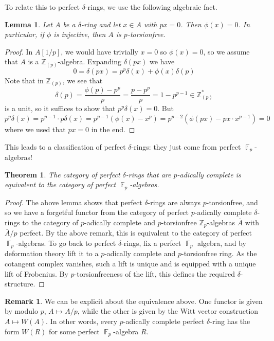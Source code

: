 \documentclass[12pt]{amsproc}
\newtheorem*{thm}{Theorem}
\newtheorem{lemma}{Lemma}
\theoremstyle{definition}
\newtheorem*{remark}{Remark}
\newcommand{\Z}{\mathbb{Z}}
\DeclareMathOperator{\F}{\mathbb{F}}
\begin{document}
To relate this to perfect $\delta$-rings, we use the following algebraic fact.

\begin{lemma} Let $A$ be a $\delta$-ring and let $x\in A$ with $px=0$. Then $\phi(x)=0$. In particular, if $\phi$ is injective, then $A$ is $p$-torsionfree. \end{lemma}
\begin{proof}
In $A[1/p]$, we would have trivially $x=0$ so $\phi(x)=0$, so we assume that $A$ is a $\Z_{(p)}$-algebra. Expanding $\delta(px)$ we have
\[	0 = \delta(px)=p^p\delta(x)+\phi(x)\delta(p)	\]
Note that in $\Z_{(p)}$, we see that
\[	\delta(p)=\frac{\phi(p)-p^p}{p}=\frac{p-p^p}{p}=1-p^{p-1}\in\Z^*_{(p)}	\]
is a unit, so it suffices to show that $p^p\delta(x)=0$. But
\[	p^p\delta(x)=p^{p-1}\cdot p\delta(x)=p^{p-1}(\phi(x)-x^p)=p^{p-2}(\phi(px)-px\cdot x^{p-1})=0	\]
where we used that $px=0$ in the end.
\end{proof}

This leads to a classification of perfect $\delta$-rings: they just come from perfect $\F_p$-algebras!

\begin{thm} The category of perfect $\delta$-rings that are $p$-adically complete is equivalent to the category of perfect $\F_p$-algebras.
\end{thm}
\begin{proof}
The above lemma shows that perfect $\delta$-rings are always $p$-torsionfree, and so we have a forgetful functor from the category of perfect $p$-adically complete $\delta$-rings to the category of $p$-adically complete and $p$-torsionfree $\Z_p$-algebras $\bar{A}$ with $\bar{A}/p$ perfect. By the above remark, this is equivalent to the category of perfect $\F_p$-algebras. To go back to perfect $\delta$-rings, fix a perfect $\F_p$ algebra, and by deformation theory lift it to a $p$-adically complete and $p$-torsionfree ring. As the cotangent complex vanishes, such a lift is unique and is equipped with a unique lift of Frobenius. By $p$-torsionfreeness of the lift, this defines the required $\delta$-structure.
\end{proof}


\begin{remark}
We can be explicit about the equivalence above. One functor is given by modulo $p$, $A\mapsto A/p$, while the other is given by the Witt vector construction $A\mapsto W(A)$. In other words, every $p$-adically complete perfect $\delta$-ring has the form $W(R)$ for some perfect $\F_p$-algebra $R$.
\end{remark}
\end{document}
